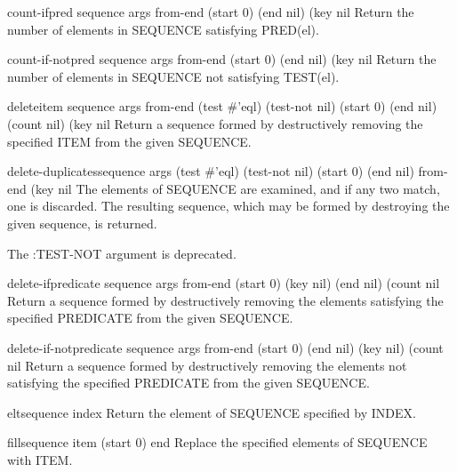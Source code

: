 \begin{function}{count-if}{pred sequence \rest args \key from-end (start 0) (end nil) (key nil}{}
  Return the number of elements in SEQUENCE satisfying PRED(el).
\end{function}

\begin{function}{count-if-not}{pred sequence \rest args \key from-end (start 0) (end nil) (key nil}{}
  Return the number of elements in SEQUENCE not satisfying TEST(el).
\end{function}

\begin{function}{delete}{item sequence \rest args \key from-end (test #'eql) (test-not nil) (start 0)
 (end nil) (count nil) (key nil}{}
  Return a sequence formed by destructively removing the specified ITEM from
  the given SEQUENCE.
\end{function}

\begin{function}{delete-duplicates}{sequence \rest args \key (test #'eql) (test-not nil) (start 0) (end nil)
 from-end (key nil}{}
  The elements of SEQUENCE are examined, and if any two match, one is
   discarded. The resulting sequence, which may be formed by destroying the
   given sequence, is returned.

   The :TEST-NOT argument is deprecated.
\end{function}

\begin{function}{delete-if}{predicate sequence \rest args \key from-end (start 0) (key nil) (end nil)
 (count nil}{}
  Return a sequence formed by destructively removing the elements satisfying
  the specified PREDICATE from the given SEQUENCE.
\end{function}

\begin{function}{delete-if-not}{predicate sequence \rest args \key from-end (start 0) (end nil) (key nil)
 (count nil}{}
  Return a sequence formed by destructively removing the elements not
  satisfying the specified PREDICATE from the given SEQUENCE.
\end{function}

\begin{accessor}{elt}{sequence index}{}
  Return the element of SEQUENCE specified by INDEX.
\end{accessor}

\begin{function}{fill}{sequence item \key (start 0) end}{}
  Replace the specified elements of SEQUENCE with ITEM.
\end{function}

